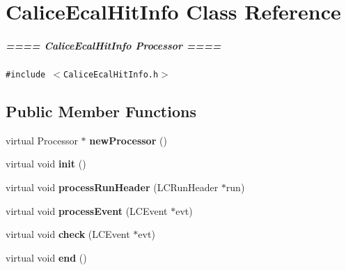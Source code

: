 \section{Calice\-Ecal\-Hit\-Info Class Reference}
\label{classCaliceEcalHitInfo}
\subparagraph*{==== Calice\-Ecal\-Hit\-Info Processor ==== } 


{\tt \#include $<$Calice\-Ecal\-Hit\-Info.h$>$}

\subsection*{Public Member Functions}
\begin{CompactItemize}
\item 
virtual Processor $\ast$ {\bf new\-Processor} ()\label{classCaliceEcalHitInfo_a0}

\item 
virtual void {\bf init} ()\label{classCaliceEcalHitInfo_a2}

\item 
virtual void {\bf process\-Run\-Header} (LCRun\-Header $\ast$run)\label{classCaliceEcalHitInfo_a3}

\item 
virtual void {\bf process\-Event} (LCEvent $\ast$evt)\label{classCaliceEcalHitInfo_a4}

\item 
virtual void {\bf check} (LCEvent $\ast$evt)\label{classCaliceEcalHitInfo_a5}

\item 
virtual void {\bf end} ()\label{classCaliceEcalHitInfo_a6}

\end{CompactItemize}
